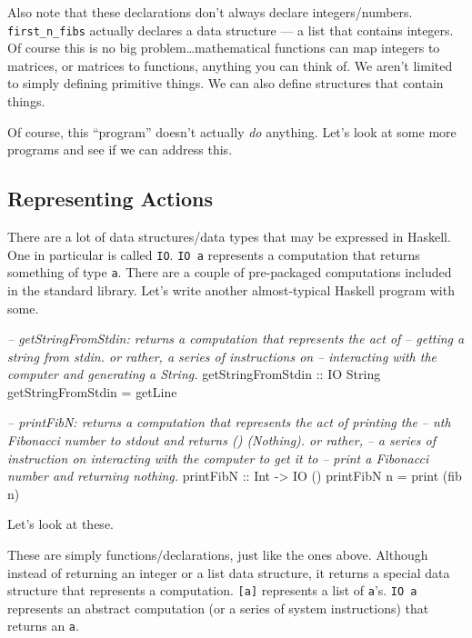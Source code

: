 \documentclass[]{article}
\newenvironment{Shaded}{}{}
\newcommand{\DataTypeTok}[1]{\textcolor[rgb]{0.56,0.13,0.00}{{#1}}}
\newcommand{\CommentTok}[1]{\textcolor[rgb]{0.38,0.63,0.69}{\textit{{#1}}}}
\newcommand{\OtherTok}[1]{\textcolor[rgb]{0.00,0.44,0.13}{{#1}}}
\newcommand{\FunctionTok}[1]{\textcolor[rgb]{0.02,0.16,0.49}{{#1}}}
\newcommand{\NormalTok}[1]{{#1}}
\begin{document}
Also note that these declarations don't always declare integers/numbers. \texttt{first\_n\_fibs}
actually declares a data structure --- a list that contains integers. Of course this is no big
problem\ldots{}mathematical functions can map integers to matrices, or matrices to functions,
anything you can think of. We aren't limited to simply defining primitive things. We can also define
structures that contain things.

Of course, this ``program'' doesn't actually \emph{do} anything. Let's look at some more programs
and see if we can address this.

\subsection{Representing Actions}\label{representing-actions}

There are a lot of data structures/data types that may be expressed in Haskell. One in particular is
called \texttt{IO}. \texttt{IO\ a} represents a computation that returns something of type
\texttt{a}. There are a couple of pre-packaged computations included in the standard library. Let's
write another almost-typical Haskell program with some.

\begin{Shaded}
\begin{Highlighting}[]
\CommentTok{--  getStringFromStdin: returns a computation that represents the act of}
\CommentTok{--      getting a string from stdin.  or rather, a series of instructions on}
\CommentTok{--      interacting with the computer and generating a String.}
\OtherTok{getStringFromStdin ::} \DataTypeTok{IO} \DataTypeTok{String}
\NormalTok{getStringFromStdin }\FunctionTok{=} \NormalTok{getLine}

\CommentTok{--  printFibN: returns a computation that represents the act of printing the}
\CommentTok{--      nth Fibonacci number to stdout and returns () (Nothing).  or rather,}
\CommentTok{--      a series of instruction on interacting with the computer to get it to}
\CommentTok{--      print a Fibonacci number and returning nothing.}
\OtherTok{printFibN ::} \DataTypeTok{Int} \OtherTok{->} \DataTypeTok{IO} \NormalTok{()}
\NormalTok{printFibN n }\FunctionTok{=} \NormalTok{print (fib n)}
\end{Highlighting}
\end{Shaded}

Let's look at these.

These are simply functions/declarations, just like the ones above. Although instead of returning an
integer or a list data structure, it returns a special data structure that represents a computation.
\texttt{{[}a{]}} represents a list of \texttt{a}'s. \texttt{IO\ a} represents an abstract
computation (or a series of system instructions) that returns an \texttt{a}.
\end{document}
